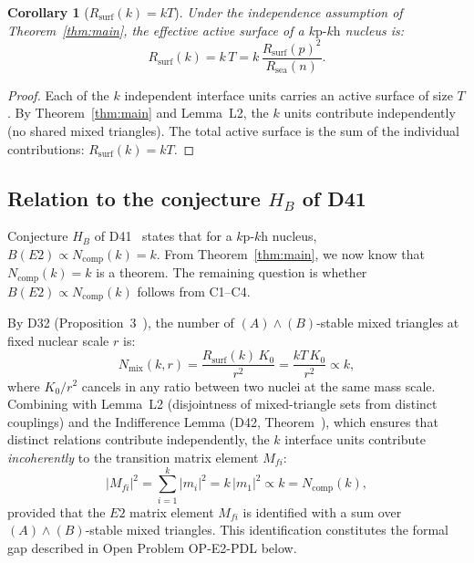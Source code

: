 \documentclass[11pt,a4paper]{article}
\newtheorem{corollary}[theorem]{Corollary}
\theoremstyle{definition}
\theoremstyle{remark}
\newcommand{\Rsurf}{R_{\mathrm{surf}}}
\newcommand{\Rsea}{R_{\mathrm{sea}}}
\newcommand{\Tpdl}{T}
\newcommand{\Ncomp}{N_{\mathrm{comp}}}
\newcommand{\kph}{k\text{p-}k\text{h}}
\begin{document}
\begin{corollary}[$\Rsurf(k) = k\Tpdl$]
\label{cor:Rsurf}
Under the independence assumption of Theorem~\ref{thm:main}, the effective active surface of a $\kph$ nucleus is:
\begin{equation}
  \Rsurf(k) = k\,\Tpdl = k\,\frac{\Rsurf(p)^2}{\Rsea(n)}.
  \label{eq:Rsurfk}
\end{equation}
\end{corollary}

\begin{proof}
Each of the $k$ independent interface units carries an active surface of size $\Tpdl$. By Theorem~\ref{thm:main} and Lemma~L2, the $k$ units contribute independently (no shared mixed triangles). The total active surface is the sum of the individual contributions: $\Rsurf(k) = k\Tpdl$.
\end{proof}

\subsection{Relation to the conjecture \texorpdfstring{$H_B$}{HB} of D41}

Conjecture $H_B$ of D41~\cite{PDL_D41} states that for a $\kph$ nucleus, $B(E2) \propto \Ncomp(k) = k$. From Theorem~\ref{thm:main}, we now know that $\Ncomp(k) = k$ is a theorem. The remaining question is whether $B(E2) \propto \Ncomp(k)$ follows from C1--C4.

By D32 (Proposition~3~\cite{PDL_D32}), the number of $(A)\wedge(B)$-stable mixed triangles at fixed nuclear scale $r$ is:
\begin{equation}
  N_{\mathrm{mix}}(k,r) = \frac{\Rsurf(k)\,K_0}{r^2} = \frac{k\Tpdl\,K_0}{r^2} \propto k,
  \label{eq:Nmix}
\end{equation}
where $K_0/r^2$ cancels in any ratio between two nuclei at the same mass scale. Combining with Lemma~L2 (disjointness of mixed-triangle sets from distinct couplings) and the Indifference Lemma (D42, Theorem~\cite{PDL_D42}), which ensures that distinct relations contribute independently, the $k$ interface units contribute \emph{incoherently} to the transition matrix element $M_{fi}$:
\begin{equation}
  |M_{fi}|^2 = \sum_{i=1}^{k} |m_i|^2 = k\,|m_1|^2 \propto k = \Ncomp(k),
  \label{eq:incoherent}
\end{equation}
provided that the $E2$ matrix element $M_{fi}$ is identified with a sum over $(A)\wedge(B)$-stable mixed triangles. This identification constitutes the formal gap described in Open Problem OP-E2-PDL below.
\end{document}
